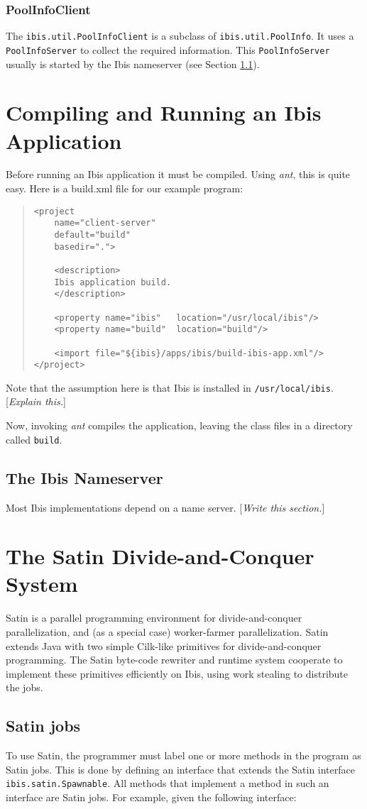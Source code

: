 \documentclass[10pt]{article}
\newcommand{\mysection}[1]{\section{#1}\label{#1}}
\newcommand{\mysubsection}[1]{\subsection{#1}\label{#1}}
\newcommand{\mysubsubsection}[1]{\subsubsection{#1}\label{#1}}
\newcommand{\remark}[1]{[\emph{#1}]}
\begin{document}
\mysubsubsection{PoolInfoClient}

The \verb+ibis.util.PoolInfoClient+ is a subclass of
\verb+ibis.util.PoolInfo+.
It uses a \verb+PoolInfoServer+ to collect the required information.
This \verb+PoolInfoServer+ usually is started by the Ibis nameserver
(see Section \ref{The Ibis Nameserver}).

\mysection{Compiling and Running an Ibis Application}

Before running an Ibis application it must be compiled.
Using \emph{ant}, this is quite easy. Here is a build.xml file for
our example program:

\begin{quote}
\begin{verbatim}
<project
    name="client-server"
    default="build"
    basedir=".">

    <description>
    Ibis application build.
    </description>

    <property name="ibis"   location="/usr/local/ibis"/>
    <property name="build"  location="build"/>

    <import file="${ibis}/apps/ibis/build-ibis-app.xml"/>
</project>
\end{verbatim}
\end{quote}
Note that the assumption here is that Ibis is installed in
\verb+/usr/local/ibis+.
\remark{Explain this.}

Now, invoking \emph{ant} compiles the application, leaving the class files
in a directory called \verb+build+.

\mysubsection{The Ibis Nameserver}

Most Ibis implementations depend on a name server.
\remark{Write this section.}

\mysection{The Satin Divide-and-Conquer System}

Satin is a parallel programming environment for divide-and-conquer
parallelization, and (as a special case) worker-farmer parallelization.
Satin extends Java with two simple Cilk-like primitives for
divide-and-conquer programming.  The Satin byte-code rewriter and
runtime system cooperate to implement these primitives efficiently on
Ibis, using work stealing to distribute the jobs.

\mysubsection{Satin jobs}

To use Satin, the programmer must label one or more methods in the program
as Satin jobs. This is done by defining an interface that extends
the Satin interface \verb+ibis.satin.Spawnable+.
All methods that implement a method in such an
interface are Satin jobs. For example, given the following interface:
\end{document}
